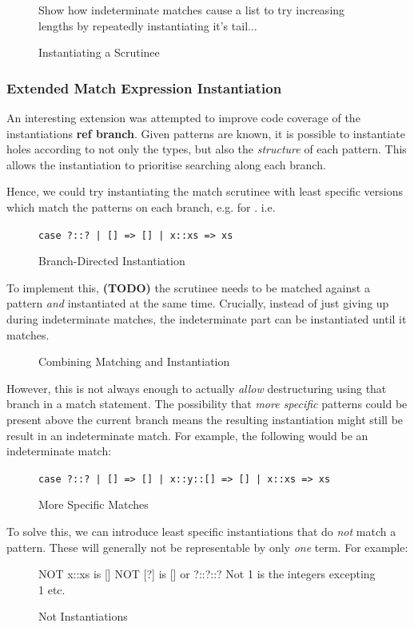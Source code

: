 \begin{figure}
Show how indeterminate matches cause a list to try increasing lengths by repeatedly instantiating it's tail...
\caption{Instantiating a Scrutinee}
\end{figure}

\subsubsection{Extended Match Expression Instantiation}
An interesting extension was attempted to improve code coverage of the instantiations \textbf{ref branch}. Given patterns are known, it is possible to instantiate holes according to not only the types, but also the \textit{structure} of each pattern. This allows the instantiation to prioritise searching along each branch.

Hence, we could try instantiating the match scrutinee with least specific versions which match the patterns on each branch, e.g.  for . i.e. 

\begin{figure}
\texttt{case ?::? | [] => [] | x::xs => xs}
\caption{Branch-Directed Instantiation}
\end{figure}

To implement this, \textbf{(TODO)} the scrutinee needs to be matched against a pattern \textit{and} instantiated at the same time. Crucially, instead of just giving up during indeterminate matches, the indeterminate part can be instantiated until it matches.

\begin{figure}[H]
\caption{Combining Matching and Instantiation}
\end{figure}

However, this is not always enough to actually \textit{allow} destructuring using that branch in a match statement. The possibility that \textit{more specific} patterns could be present above the current branch means the resulting instantiation might still be result in an indeterminate match. For example, the following would be an indeterminate match:

\begin{figure}[H]
\texttt{case ?::? | [] => [] | x::y::[] => [] | x::xs => xs}

\caption{More Specific Matches}
\end{figure}

To solve this, we can introduce least specific instantiations that do \textit{not} match a pattern. These will generally not be representable by only \textit{one} term. For example:
\begin{figure}
NOT x::xs is []
NOT [?] is [] or ?::?::? 
Not 1 is the integers excepting 1
etc.
\caption{Not Instantiations}
\end{figure}

